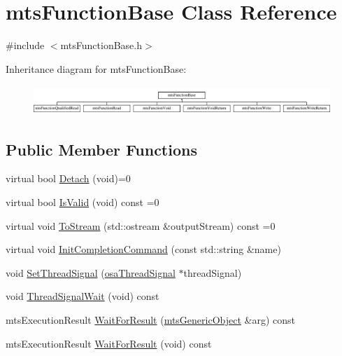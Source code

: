 \hypertarget{classmts_function_base}{}\section{mts\+Function\+Base Class Reference}
\label{classmts_function_base}


{\ttfamily \#include $<$mts\+Function\+Base.\+h$>$}

Inheritance diagram for mts\+Function\+Base\+:\begin{figure}[H]
\begin{center}
\leavevmode
\includegraphics[height=1.117764cm]{d9/d3d/classmts_function_base}
\end{center}
\end{figure}
\subsection*{Public Member Functions}
\begin{DoxyCompactItemize}
\item 
virtual bool \hyperlink{classmts_function_base_a92dd688c12afb4771318b8ed29aa9c07}{Detach} (void)=0
\item 
virtual bool \hyperlink{classmts_function_base_ac0bea342090b03346b58232eb5f9f5d8}{Is\+Valid} (void) const =0
\item 
virtual void \hyperlink{classmts_function_base_ae6e5497be34d5563f2df3cb24d68e959}{To\+Stream} (std\+::ostream \&output\+Stream) const =0
\item 
virtual void \hyperlink{classmts_function_base_a77240cbe7459e0fea4b1eb4c7f9a53ad}{Init\+Completion\+Command} (const std\+::string \&name)
\item 
void \hyperlink{classmts_function_base_acf5a46f51a63801aa3da6c4fb4497f49}{Set\+Thread\+Signal} (\hyperlink{classosa_thread_signal}{osa\+Thread\+Signal} $\ast$thread\+Signal)
\item 
void \hyperlink{classmts_function_base_ab8e3e4767f9036a4950fba809530756a}{Thread\+Signal\+Wait} (void) const 
\item 
mts\+Execution\+Result \hyperlink{classmts_function_base_a37ccde77fd39ec754fb6bb57635c0fed}{Wait\+For\+Result} (\hyperlink{classmts_generic_object}{mts\+Generic\+Object} \&arg) const 
\item 
mts\+Execution\+Result \hyperlink{classmts_function_base_a27daf6336f69e18f79f292ac8b73376c}{Wait\+For\+Result} (void) const 
\end{DoxyCompactItemize}
